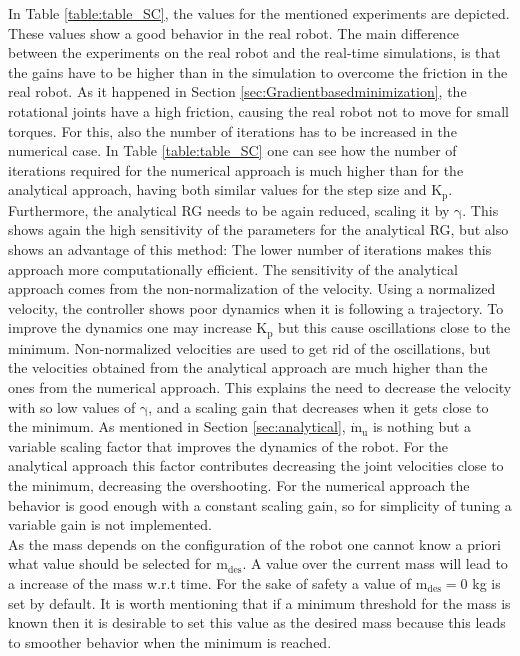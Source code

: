 In Table \ref{table:table_SC}, the values for the mentioned experiments are depicted. These values show a good behavior in the real robot. The main difference between the experiments on the real robot and the real-time simulations, is that the gains have to be higher than in the simulation to overcome the friction in the real robot. As it happened in Section \ref{sec:Gradientbasedminimization}, the rotational joints have a high friction, causing the real robot not to move for small torques. For this, also the number of iterations has to be increased in the numerical case. 
 In Table \ref{table:table_SC} one can see how the number of iterations required for the numerical approach is much higher than for the analytical approach, having both similar values for the step size and $\mathrm{K_p}$. Furthermore, the analytical RG needs to be again  reduced, scaling it by $\mathrm{\gamma}$. This shows again the high sensitivity of the parameters for the analytical RG, but also shows an advantage of this method: The lower number of iterations makes this approach more computationally efficient. The sensitivity of the analytical approach comes from the non-normalization of the velocity. Using a normalized velocity, the controller shows poor dynamics when it is following a trajectory. To improve the dynamics one may increase $\mathrm{K_p}$ but this cause oscillations close to the minimum. Non-normalized velocities are used to get rid of the oscillations, but the velocities obtained from the analytical approach are much higher than the ones from the numerical approach. This explains the need to decrease the velocity with so low values of $\mathrm{\gamma}$, and a scaling gain that decreases when it gets close to the minimum.
As mentioned in Section \ref{sec:analytical},  $\mathrm{\dot{m}_u}$ is nothing but a variable scaling factor that improves the dynamics of the robot. For the analytical approach this factor contributes decreasing the joint velocities close to the minimum, decreasing the overshooting.
For the numerical approach the behavior is good enough with a constant scaling gain, so for simplicity of tuning a variable gain is not implemented.  \\
As the mass depends on the  configuration of the robot one cannot know a priori what value should be selected for $\mathrm{m_{des}}$. A value over the current mass will lead to a increase of the mass w.r.t time. 
For the sake of safety a value of $\mathrm{m_{des}=0}$ kg is set by default. It is worth mentioning that if a minimum threshold for the mass is known then it is desirable to set this value as the desired mass because this leads to smoother behavior when the minimum is reached.




